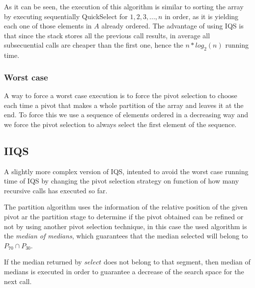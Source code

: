 As it can be seen, the execution of this algorithm is similar to sorting the array by executing sequentially QuickSelect for $1,2,3,...,n$ in order, as it is yielding each one of those elements in $A$ already ordered. The advantage of using IQS is that since the stack stores all the previous call results, in average all subsecuential calls are cheaper than the first one, hence the $n*log_2(n)$ running time.

\subsubsection{Worst case}
A way to force a worst case execution is to force the pivot selection to choose each time a pivot that makes a whole partition of the array and leaves it at the end. To force this we use a sequence of elements ordered in a decreasing way and we force the pivot selection to always select the first element of the sequence.

\subsection{IIQS}

A slightly more complex version of IQS, intented to avoid the worst case running time of IQS by changing the pivot selection strategy on function of how many recursive calls has executed so far\cite{7416566}.

The partition algorithm uses the information of the relative position of the given pivot ar the partition stage to determine if the pivot obtained can be refined or not by using another pivot selection technique, in this case the used algorithm is the \textit{median of medians}\cite{Blum_Floyd_Pratt_Rivest_Tarjan_1973}, which guarantees that the median selected will belong to $P_{70} \cap P_{30}$.

If the median returned by $select$ does not belong to that segment, then median of medians is executed in order to guarantee a decrease of the search space for the next call.

